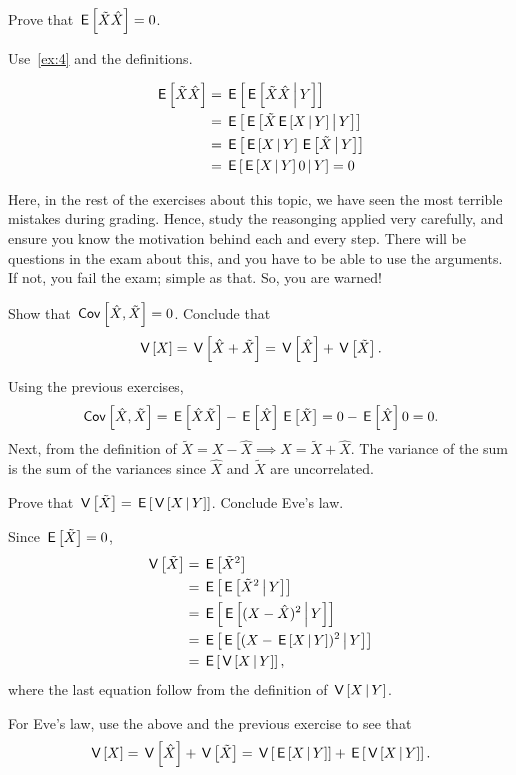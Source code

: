 \begin{exercise}
Prove that $\,\mathsf{E}\left[\tilde X\hat X\right] = 0$.
\begin{hint}
  Use~\cref{ex:4} and the definitions.
\end{hint}
\begin{solution}
\begin{align}
\,\mathsf{E}\left[\tilde X\hat X\right] &= \,\mathsf{E}\left[\,\mathsf{E}\left[\tilde X \hat X \,\middle|\, Y\right]\right]  \\
&= \,\mathsf{E}\left[\,\mathsf{E}\left[\tilde X \,\mathsf{E}\left[X\,\middle|\, Y\right] \,\middle|\, Y\right]\right]  \\
&= \,\mathsf{E}\left[\,\mathsf{E}\left[X\,\middle|\, Y\right]\,\mathsf{E}\left[\tilde X \,\middle|\, Y\right]\right]  \\
&= \,\mathsf{E}\left[\,\mathsf{E}\left[X\,\middle|\, Y\right] 0  \,\middle|\, Y\right]  = 0
\end{align}

Here, in the rest of the exercises about this topic, we have seen the most terrible mistakes during grading.
Hence, study the reasonging applied very carefully, and ensure you know the motivation behind each and every step.
There will be questions in the exam about this, and you have to be able to use the arguments. If not, you fail the exam; simple as that. So, you are warned!
\end{solution}
\end{exercise}

\begin{exercise}
Show that $\,\mathsf{Cov}\left[\hat X, \tilde X\right] = 0$. Conclude that
\begin{equation}
\label{eq:8}
\V{X} = \V{\hat X + \tilde X} = \V{\hat X} + \V{\tilde X}.
\end{equation}
\begin{solution}
Using the previous exercises,
\begin{equation}
\,\mathsf{Cov}\left[\hat X, \tilde X\right] = \,\mathsf{E}\left[\hat X \tilde X\right] - \,\mathsf{E}\left[\hat X\right] \,\mathsf{E}\left[\tilde X\right] = 0 - \,\mathsf{E}\left[\hat X\right] 0 = 0.
\end{equation}
Next, from the definition of $\tilde X = X - \hat X \implies X = \tilde X + \hat X$.
The variance of the sum is the sum of the variances since $\hat X$ and $\tilde X$ are uncorrelated.
\end{solution}
\end{exercise}

\begin{exercise}
Prove that $\,\mathsf{V}\left[\tilde X\right] = \,\mathsf{E}\left[\,\mathsf{V}\left[X\,\middle|\, Y\right]\right]$. Conclude Eve's law.
\begin{solution}
Since $\,\mathsf{E}\left[\tilde X\right] = 0$,
\begin{align}
\label{eq:9}
\V{\tilde X} &= \E{\tilde X^{2}}  \\
&= \E{\E{\tilde X^{2}\given Y}} \\
&= \E{\E{(X - \hat X)^{2}\given Y}} \\
&= \E{\E{(X - \E{X\given Y})^{2}\given Y}} \\
&= \E{\V{X\given Y}},
\end{align}
where the last equation follow from the definition of $\,\mathsf{V}\left[X\,\middle|\, Y\right]$.

For Eve's law, use the above and the previous exercise to see that
\begin{equation}
\,\mathsf{V}\left[X\right] = \,\mathsf{V}\left[\hat X\right] + \,\mathsf{V}\left[\tilde X\right] = \,\mathsf{V}\left[\,\mathsf{E}\left[X\,\middle|\, Y\right]\right] + \,\mathsf{E}\left[\,\mathsf{V}\left[X\,\middle|\, Y\right]\right].
\end{equation}
\end{solution}
\end{exercise}

